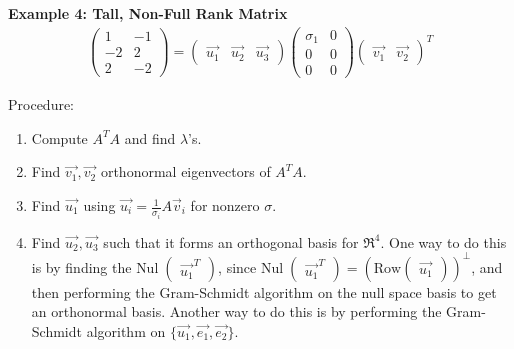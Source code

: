 \noindent
\newline
\textbf{Example 4: Tall, Non-Full Rank Matrix}
\begin{align}
    \begin{pmatrix}
        1 & -1 \\ -2 & 2 \\ 2 & -2
    \end{pmatrix} = \begin{pmatrix}
        \Vec{u_1} & \Vec{u_2} & \Vec{u_3}
    \end{pmatrix} \begin{pmatrix}
        \sigma_1 & 0 \\ 0 & 0 \\ 0 & 0
    \end{pmatrix} \begin{pmatrix}
        \Vec{v_1} & \Vec{v_2}
    \end{pmatrix}^T
\end{align}

\noindent
Procedure:
\begin{enumerate}
    \item Compute \(A^T A\) and find \(\lambda\)'s.
    \item Find \(\Vec{v_1}, \Vec{v_2}\) orthonormal eigenvectors of \(A^T A\).
    \item Find \(\Vec{u_1}\) using \(\Vec{u_i} = \frac{1}{\sigma_i} A\Vec{v}_i\) for nonzero \(\sigma\).
    \item Find \(\Vec{u_2}, \Vec{u_3}\) such that it forms an orthogonal basis for \(\Re^4\). One way to do this is by finding the \(\text{Nul} \; \begin{pmatrix}
        \Vec{u_1}^T
    \end{pmatrix}\), since \(\text{Nul} \; \begin{pmatrix}
        \Vec{u_1}^T
    \end{pmatrix} = \left(\text{Row} \begin{pmatrix}
        \Vec{u_1}
    \end{pmatrix} \right)^\perp\), and then performing the Gram-Schmidt algorithm on the null space basis to get an orthonormal basis. Another way to do this is by performing the Gram-Schmidt algorithm on \(\{ \Vec{u_1}, \Vec{e_1}, \Vec{e_2} \}\).
\end{enumerate}

